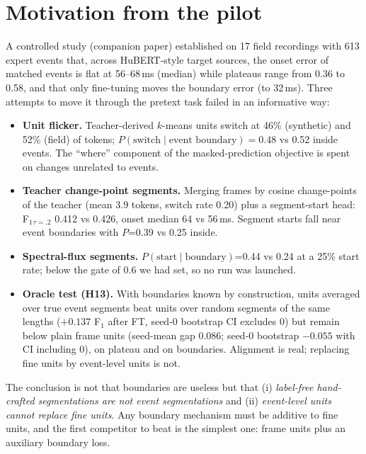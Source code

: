 \documentclass[10pt,twocolumn]{article}
\newcommand{\Fone}{F$_1$}
\begin{document}
\section{Motivation from the pilot}
A controlled study (companion paper) established on 17 field recordings with 613 expert events that, across HuBERT-style target sources, the onset error of matched events is flat at 56--68\,ms (median) while plateaus range from 0.36 to 0.58, and that only fine-tuning moves the boundary error (to 32\,ms). Three attempts to move it through the pretext task failed in an informative way:
\begin{itemize}\setlength{\itemsep}{1pt}
\item \textbf{Unit flicker.} Teacher-derived $k$-means units switch at 46\% (synthetic) and 52\% (field) of tokens; $P(\text{switch}\mid\text{event boundary})=0.48$ vs 0.52 inside events. The ``where'' component of the masked-prediction objective is spent on changes unrelated to events.
\item \textbf{Teacher change-point segments.} Merging frames by cosine change-points of the teacher (mean 3.9 tokens, switch rate 0.20) plus a segment-start head: \Fone{}$_{\tau=.2}$ 0.412 vs 0.426, onset median 64 vs 56\,ms. Segment starts fall near event boundaries with $P$=0.39 vs 0.25 inside.
\item \textbf{Spectral-flux segments.} $P(\text{start}\mid\text{boundary})$=0.44 vs 0.24 at a 25\% start rate; below the gate of 0.6 we had set, so no run was launched.
\item \textbf{Oracle test (H13).} With boundaries known by construction, units averaged over true event segments beat units over random segments of the same lengths ($+0.137$ \Fone{} after FT, seed-0 bootstrap CI excludes 0) but remain below plain frame units (seed-mean gap 0.086; seed-0 bootstrap $-0.055$ with CI including 0), on plateau and on boundaries. Alignment is real; replacing fine units by event-level units is not.
\end{itemize}
The conclusion is not that boundaries are useless but that (i) \emph{label-free hand-crafted segmentations are not event segmentations} and (ii) \emph{event-level units cannot replace fine units}. Any boundary mechanism must be additive to fine units, and the first competitor to beat is the simplest one: frame units plus an auxiliary boundary loss.
\end{document}
